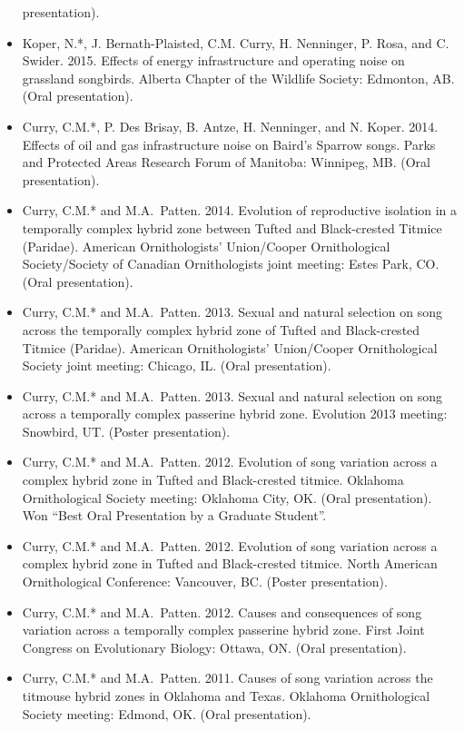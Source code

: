 \documentclass[
  letterpaper,
  DIV=11,
  numbers=noendperiod,
  oneside]{scrreprt}
\begin{document}
\begin{itemize}
  presentation).
\item
  Koper, N.*, J. Bernath-Plaisted, C.M. Curry, H. Nenninger, P. Rosa,
  and C. Swider. 2015. Effects of energy infrastructure and operating
  noise on grassland songbirds. Alberta Chapter of the Wildlife Society:
  Edmonton, AB. (Oral presentation).
\item
  Curry, C.M.*, P. Des Brisay, B. Antze, H. Nenninger, and N. Koper.
  2014. Effects of oil and gas infrastructure noise on Baird's Sparrow
  songs. Parks and Protected Areas Research Forum of Manitoba: Winnipeg,
  MB. (Oral presentation).
\item
  Curry, C.M.* and M.A.~Patten. 2014. Evolution of reproductive
  isolation in a temporally complex hybrid zone between Tufted and
  Black-crested Titmice (Paridae). American Ornithologists' Union/Cooper
  Ornithological Society/Society of Canadian Ornithologists joint
  meeting: Estes Park, CO. (Oral presentation).
\item
  Curry, C.M.* and M.A.~Patten. 2013. Sexual and natural selection on
  song across the temporally complex hybrid zone of Tufted and
  Black-crested Titmice (Paridae). American Ornithologists' Union/Cooper
  Ornithological Society joint meeting: Chicago, IL. (Oral
  presentation).
\item
  Curry, C.M.* and M.A.~Patten. 2013. Sexual and natural selection on
  song across a temporally complex passerine hybrid zone. Evolution 2013
  meeting: Snowbird, UT. (Poster presentation).
\item
  Curry, C.M.* and M.A.~Patten. 2012. Evolution of song variation across
  a complex hybrid zone in Tufted and Black-crested titmice. Oklahoma
  Ornithological Society meeting: Oklahoma City, OK. (Oral
  presentation). Won ``Best Oral Presentation by a Graduate Student''.
\item
  Curry, C.M.* and M.A.~Patten. 2012. Evolution of song variation across
  a complex hybrid zone in Tufted and Black-crested titmice. North
  American Ornithological Conference: Vancouver, BC. (Poster
  presentation).
\item
  Curry, C.M.* and M.A.~Patten. 2012. Causes and consequences of song
  variation across a temporally complex passerine hybrid zone. First
  Joint Congress on Evolutionary Biology: Ottawa, ON. (Oral
  presentation).
\item
  Curry, C.M.* and M.A.~Patten. 2011. Causes of song variation across
  the titmouse hybrid zones in Oklahoma and Texas. Oklahoma
  Ornithological Society meeting: Edmond, OK. (Oral presentation).

\end{itemize}
\end{document}
